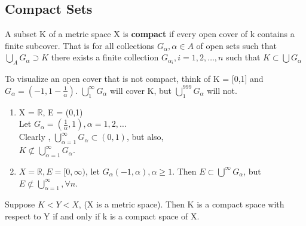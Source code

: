 \documentclass[11pt,fleqn]{book} %
\begin{document}
\subsection{Compact Sets} %

\begin{definition}
	A subset K of a metric space X is \textbf{compact} if every open cover of k contains a finite subcover.
	That is for all collections $G_\alpha, \alpha \in A$ of open sets such that $\bigcup\limits_A G_\alpha \supset K$ there exists a finite collection $G_{\alpha_i}, i = 1,2,\dots, n$ such that $K \subset \bigcup G_\alpha$
\end{definition}

\begin{remark}
	To visualize an open cover that is not compact, think of K = [0,1] and $G_\alpha = (-1, 1- \frac{1}{\alpha})$. $\bigcup\limits_1^\infty G_\alpha$ will cover K, but $\bigcup\limits_1^{999} G_\alpha$ will not. 
\end{remark}

\begin{example}
	\begin{enumerate}[label = \alph*)]	
		\item X = $\mathbb{R}$, E = (0,1)\\
		Let $G_\alpha = (\frac{1}{\alpha},1), \alpha = 1, 2, \dots$\\
		Clearly , $\bigcup\limits^\infty_{\alpha = 1} G_\alpha \subset (0,1)$, but also,\\
		$K \not\subset \bigcup\limits^\infty_{\alpha = 1} G_\alpha$.
		\item $X = \mathbb{R}, E=[0,\infty)$, let $G_\alpha(-1, \alpha), \alpha \ge 1$. Then $E \subset \bigcup\limits^\infty G_\alpha$, but $E \not\subset \bigcup\limits^\infty_{\alpha = 1}, \forall n$.
	\end{enumerate}	
\end{example}

\begin{theorem}
	Suppose $K < Y < X$, (X is a metric space). Then K is a compact space with respect to Y if and only if k is a compact space of X.
\end{theorem}
\end{document}
